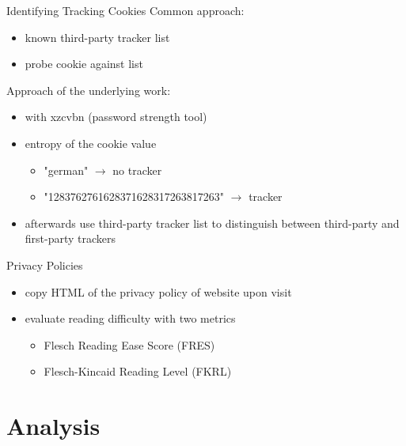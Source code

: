 \documentclass[xcolor={dvipsnames}]{beamer}
\begin{document}
\begin{frame}{Identifying Tracking Cookies}
    Common approach:
    \begin{itemize}
        \item known third-party tracker list
        \item probe cookie against list
    \end{itemize}

    \pause
    \vspace{2em}

    Approach of the underlying work:
    \begin{itemize}
        \item with xzcvbn (password strength tool)
        \item entropy of the cookie value
            \begin{itemize}
                \item "german" $\rightarrow$ no tracker
                \item "1283762761628371628317263817263" $\rightarrow$ tracker
            \end{itemize}
        \item afterwards use third-party tracker list to distinguish between third-party and first-party trackers
    \end{itemize}
\end{frame}

\begin{frame}{Privacy Policies}
    \begin{itemize}
        \item copy HTML of the privacy policy of website upon visit
        \item evaluate reading difficulty with two metrics
            \begin{itemize}
                \item Flesch Reading Ease Score (FRES)
                \item Flesch-Kincaid Reading Level (FKRL)
        \end{itemize}
    \end{itemize}
\end{frame}

\section{Analysis}
\end{document}
